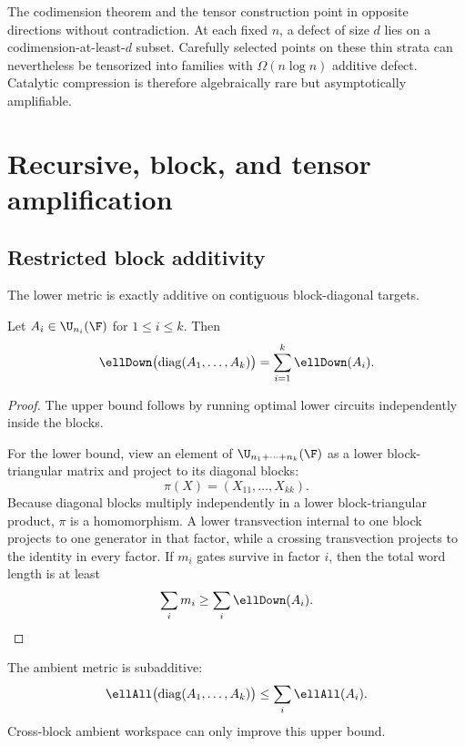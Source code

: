 \begin{remark}\label{rem:rare-amplifiable}
The codimension theorem and the tensor construction point in opposite directions without contradiction.  At each fixed $n$, a defect of size $d$ lies on a codimension-at-least-$d$ subset.  Carefully selected points on these thin strata can nevertheless be tensorized into families with $\Omega(n\log n)$ additive defect.  Catalytic compression is therefore algebraically rare but asymptotically amplifiable.
\end{remark}

\section{Recursive, block, and tensor amplification}\label{sec:amplification}

\subsection{Restricted block additivity}

The lower metric is exactly additive on contiguous block-diagonal targets.

\begin{proposition}\label{prop:block-additivity}
Let $A_i\in\U_{n_i}(\F)$ for $1\le i\le k$.  Then
\[
\ellDown\bigl(\operatorname{diag}(A_1,\ldots,A_k)\bigr)
=
\sum_{i=1}^k\ellDown(A_i).
\]
\end{proposition}

\begin{proof}
The upper bound follows by running optimal lower circuits independently inside the blocks.

For the lower bound, view an element of $\U_{n_1+\cdots+n_k}(\F)$ as a lower block-triangular matrix and project to its diagonal blocks:
\[
\pi(X)=(X_{11},\ldots,X_{kk}).
\]
Because diagonal blocks multiply independently in a lower block-triangular product, $\pi$ is a homomorphism.  A lower transvection internal to one block projects to one generator in that factor, while a crossing transvection projects to the identity in every factor.  If $m_i$ gates survive in factor $i$, then the total word length is at least
\[
\sum_i m_i
\ge
\sum_i\ellDown(A_i).
\]
\end{proof}

The ambient metric is subadditive:
\[
\ellAll\bigl(\operatorname{diag}(A_1,\ldots,A_k)\bigr)
\le
\sum_i\ellAll(A_i).
\]
Cross-block ambient workspace can only improve this upper bound.

